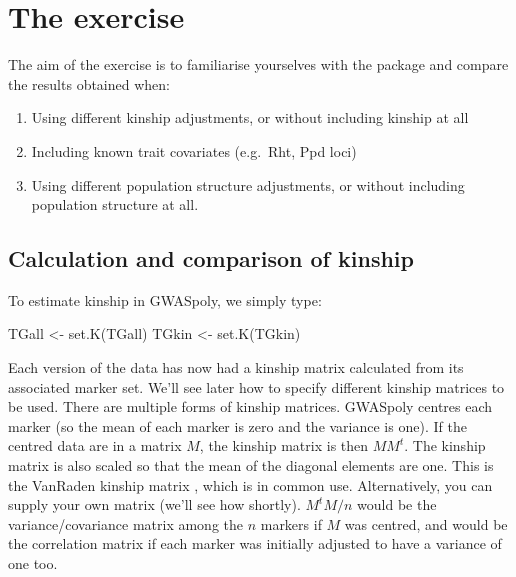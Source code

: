 \documentclass[
]{book}
\newenvironment{Shaded}{\begin{snugshade}}{\end{snugshade}}
\newcommand{\FunctionTok}[1]{\textcolor[rgb]{0.00,0.00,0.00}{#1}}
\newcommand{\NormalTok}[1]{#1}
\newcommand{\OtherTok}[1]{\textcolor[rgb]{0.56,0.35,0.01}{#1}}
\providecommand{\tightlist}{%
  \setlength{\itemsep}{0pt}\setlength{\parskip}{0pt}}
\begin{document}
\hypertarget{the-exercise-2}{%
\section{The exercise}\label{the-exercise-2}}

The aim of the exercise is to familiarise yourselves with the package and compare the results obtained when:

\begin{enumerate}
\def\labelenumi{\alph{enumi})}
\tightlist
\item
  Using different kinship adjustments, or without including kinship at all
\item
  Including known trait covariates (e.g.~Rht, Ppd loci)
\item
  Using different population structure adjustments, or without including population structure at all.
\end{enumerate}

\hypertarget{calculation-and-comparison-of-kinship}{%
\subsection{Calculation and comparison of kinship}\label{calculation-and-comparison-of-kinship}}

To estimate kinship in GWASpoly, we simply type:

\begin{Shaded}
\begin{Highlighting}[]
\NormalTok{TGall }\OtherTok{\textless{}{-}} \FunctionTok{set.K}\NormalTok{(TGall)}
\NormalTok{TGkin }\OtherTok{\textless{}{-}} \FunctionTok{set.K}\NormalTok{(TGkin)}
\end{Highlighting}
\end{Shaded}

Each version of the data has now had a kinship matrix calculated from its associated marker set. We'll see later how to specify different kinship matrices to be used. There are multiple forms of kinship matrices. GWASpoly centres each marker (so the mean of each marker is zero and the variance is one). If the centred data are in a matrix \(M\), the kinship matrix is then \(MM^t\). The kinship matrix is also scaled so that the mean of the diagonal elements are one. This is the VanRaden kinship matrix \citep{vanraden_efficient_2008}, which is in common use. Alternatively, you can supply your own matrix (we'll see how shortly). \(M^tM/n\) would be the variance/covariance matrix among the \(n\) markers if \(M\) was centred, and would be the correlation matrix if each marker was initially adjusted to have a variance of one too.
\end{document}
